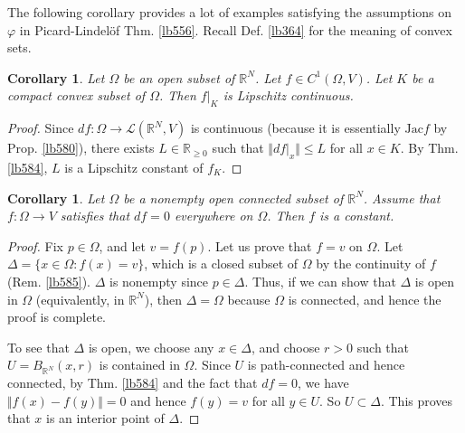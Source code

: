 \documentclass[12pt,b5paper,notitlepage]{article}
\theoremstyle{definition}
\theoremstyle{plain}
\newtheorem{co}[df]{Corollary}
\newcommand{\mc}{\mathcal}
\newcommand{\Rbb}{\mathbb R}
\newcommand{\Jac}{\mathrm{Jac}}
\numberwithin{equation}{section}
\begin{document}
The following corollary provides a lot of examples satisfying the assumptions on $\varphi$ in Picard-Lindel\"of Thm. \ref{lb556}. Recall Def. \ref{lb364} for the meaning of convex sets.


\begin{co}
Let $\Omega$ be an open subset of $\Rbb^N$. Let $f\in C^1(\Omega,V)$. Let $K$ be a compact convex subset of $\Omega$. Then $f|_K$ is Lipschitz continuous.
\end{co}

\begin{proof}
Since $df:\Omega\rightarrow \mc L(\Rbb^N,V)$ is continuous (because it is essentially $\Jac f$ by Prop. \ref{lb580}), there exists $L\in\Rbb_{\geq0}$ such that $\Vert df|_x\Vert\leq L$ for all $x\in K$. By Thm. \ref{lb584}, $L$ is a Lipschitz constant of $f_K$.
\end{proof}


\begin{co}
Let $\Omega$ be a nonempty open connected subset of $\Rbb^N$. Assume that $f:\Omega\rightarrow V$ satisfies that $df=0$ everywhere on $\Omega$. Then $f$ is a constant.
\end{co}

\begin{proof}
Fix $p\in\Omega$, and let $v=f(p)$. Let us prove that $f=v$ on $\Omega$. Let $\Delta=\{x\in\Omega:f(x)=v\}$, which is a closed subset of $\Omega$ by the continuity of $f$ (Rem. \ref{lb585}). $\Delta$ is nonempty since $p\in\Delta$. Thus, if we can show that $\Delta$ is open in $\Omega$ (equivalently, in $\Rbb^N$), then $\Delta=\Omega$ because $\Omega$ is connected, and hence the proof is complete.

To see that $\Delta$ is open, we choose any $x\in\Delta$, and choose $r>0$ such that $U=B_{\Rbb^N}(x,r)$ is contained in $\Omega$. Since $U$ is path-connected and hence connected, by Thm. \ref{lb584} and the fact that $df=0$, we have $\Vert f(x)-f(y)\Vert=0$ and hence $f(y)=v$ for all $y\in U$. So $U\subset\Delta$. This proves that $x$ is an interior point of $\Delta$.
\end{proof}











\hypertarget{beforeindex}{}
\end{document}
